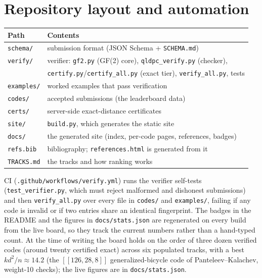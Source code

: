 \documentclass[11pt]{article}
\newcommand{\eff}{kd^2/n}
\begin{document}
	\section{Repository layout and automation}

	\begin{center}
		\begin{tabular}{ll}
			\toprule
			Path & Contents\\
			\midrule
			\texttt{schema/}   & submission format (JSON Schema + \texttt{SCHEMA.md})\\
			\texttt{verify/}   & verifier: \texttt{gf2.py} (GF(2) core),
			                     \texttt{qldpc\_verify.py} (checker),\\
			                  & \texttt{certify.py}/\texttt{certify\_all.py} (exact tier),
			                     \texttt{verify\_all.py}, tests\\
			\texttt{examples/} & worked examples that pass verification\\
			\texttt{codes/}    & accepted submissions (the leaderboard data)\\
			\texttt{certs/}    & server-side exact-distance certificates\\
			\texttt{site/}     & \texttt{build.py}, which generates the static site\\
			\texttt{docs/}     & the generated site (index, per-code pages,
			                     references, badges)\\
			\texttt{refs.bib}  & bibliography; \texttt{references.html} is generated from it\\
			\texttt{TRACKS.md} & the tracks and how ranking works\\
			\bottomrule
		\end{tabular}
	\end{center}
	CI (\texttt{.github/workflows/verify.yml}) runs the verifier self-tests
	(\texttt{test\_verifier.py}, which must reject malformed and dishonest
	submissions) and then \texttt{verify\_all.py} over every file in
	\texttt{codes/} and \texttt{examples/}, failing if any code is invalid or if
	two entries share an identical fingerprint. The badges in the README and the
	figures in \texttt{docs/stats.json} are regenerated on every build from the
	live board, so they track the current numbers rather than a hand-typed
	count. At the time of writing the board holds on the order of three dozen
	verified codes (around twenty certified exact) across six populated tracks,
	with a best $\eff\approx 14.2$ (the $[[126,28,8]]$ generalized-bicycle code
	of Panteleev--Kalachev, weight-10 checks); the live figures are in
	\texttt{docs/stats.json}.
\end{document}
